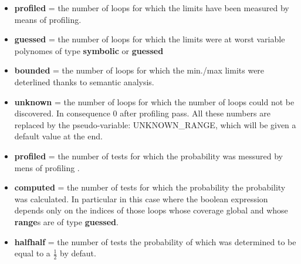 \documentclass[a4]{article}
\begin{document}
{
\begin{itemize}

\item {\bf profiled} = the number of loops for which the limits have
  been measured by means of profiling.
 
\item {\bf guessed} = the number of loops for which the limits were at
  worst variable polynomes of type {\bf symbolic} or {\bf guessed}
 
\item {\bf bounded} = the number of loops for which the min./max
  limits were deterlined thanks to semantic analysis.
 
\item {\bf unknown} = the number of loops for which the number of
  loops could not be discovered. In consequence 0 after profiling
  pass. All these numbers are replaced by the pseudo-variable:
  UNKNOWN\_RANGE, which will be given a default value at the end.
\end{itemize}
}
 
{
\begin{itemize}

\item {\bf profiled} = the number of tests for which the probability
  was messured by mens of profiling .
 
\item {\bf computed} = the number of tests for which the probability
  the probability was calculated. In particular in this case where the
  boolean expression depends only on the indices of those loops whose
  coverage global and whose {\bf range}s are of type {\bf guessed}.
 
\item {\bf halfhalf} = the number of tests the probability of which
  was determined to be equal to a $\frac{1}{2}$ by defaut.
\end{itemize}
 
}
 
\end{document}
